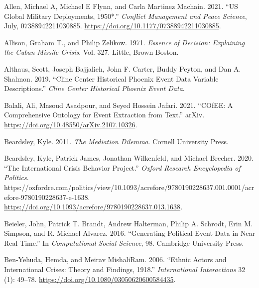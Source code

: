 \documentclass{article}
\newlength{\cslhangindent}
\newlength{\cslentryspacingunit} %
\newenvironment{CSLReferences}[2] %
 {%
  \setlength{\parindent}{0pt}
  \ifodd #1
  \let\oldpar\par
  \def\par{\hangindent=\cslhangindent\oldpar}
  \fi
  \setlength{\parskip}{#2\cslentryspacingunit}
 }%
 {}
\begin{document}
\hypertarget{refs}{}
\begin{CSLReferences}{1}{0}
\leavevmode{}%
Allen, Michael A, Michael E Flynn, and Carla Martinez Machain. 2021.
{``{US} Global Military Deployments, 1950*.''}
\emph{Conflict Management and Peace Science}, July, 07388942211030885.
\url{https://doi.org/10.1177/07388942211030885}.

\leavevmode{}%
Allison, Graham T., and Philip Zelikow. 1971. \emph{Essence of Decision:
{Explaining} the {Cuban} Missile Crisis}. Vol. 327. {Little, Brown
Boston}.

\leavevmode{}%
Althaus, Scott, Joseph Bajjalieh, John F. Carter, Buddy Peyton, and Dan
A. Shalmon. 2019. {``Cline {Center Historical Phoenix Event Data
Variable Descriptions}.''} \emph{Cline Center Historical Phoenix Event
Data}.

\leavevmode{}%
Balali, Ali, Masoud Asadpour, and Seyed Hossein Jafari. 2021.
{``{COfEE}: {A Comprehensive Ontology} for {Event Extraction} from
Text.''} {arXiv}. \url{https://doi.org/10.48550/arXiv.2107.10326}.

\leavevmode{}%
Beardsley, Kyle. 2011. \emph{The Mediation Dilemma}. {Cornell University
Press}.

\leavevmode{}%
Beardsley, Kyle, Patrick James, Jonathan Wilkenfeld, and Michael
Brecher. 2020. {``The {International Crisis Behavior Project}.''}
\emph{Oxford Research Encyclopedia of Politics}.
https://oxfordre.com/politics/view/10.1093/acrefore/9780190228637.001.0001/acrefore-9780190228637-e-1638.
\url{https://doi.org/10.1093/acrefore/9780190228637.013.1638}.

\leavevmode{}%
Beieler, John, Patrick T. Brandt, Andrew Halterman, Philip A. Schrodt,
Erin M. Simpson, and R. Michael Alvarez. 2016. {``Generating Political
Event Data in Near Real Time.''} In \emph{Computational Social Science},
98. {Cambridge University Press}.

\leavevmode{}%
Ben-Yehuda, Hemda, and Meirav MishaliRam. 2006. {``Ethnic {Actors} and
{International Crises}: {Theory} and {Findings},
1918.''} \emph{International Interactions} 32 (1):
49--78. \url{https://doi.org/10.1080/03050620600584435}.


\end{CSLReferences}
\end{document}
